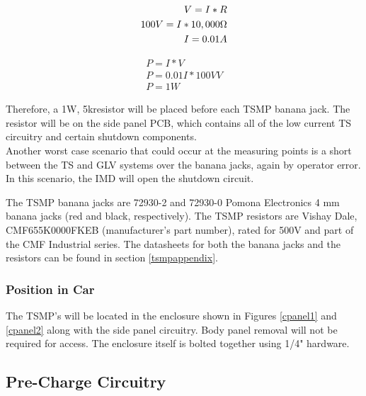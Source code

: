 \documentclass{article}
\begin{document}
            \begin{align}
                V = I * R \\
                100 V = I * 10,000 \ohm \\
                I = 0.01A
            \end{align}

            \begin{align}
                P = I * V \\
                P = 0.01 I * 100V V \\
                P = 1 W
            \end{align}

            Therefore, a 1W, 5k\ohm resistor will be placed before each TSMP banana jack. The resistor will be on the side panel PCB, which contains all of the low current TS circuitry and certain shutdown components. \\

            Another worst case scenario that could occur at the measuring points is a short between the TS and GLV systems over the banana jacks, again by operator error. In this scenario, the IMD will open the shutdown circuit.

            The TSMP banana jacks are 72930-2 and 72930-0 Pomona Electronics 4 mm banana jacks (red and black, respectively). The TSMP resistors are Vishay Dale, CMF655K0000FKEB  (manufacturer's part number), rated for 500V and part of the CMF Industrial series. The datasheets for both the banana jacks and the resistors can be found in section \ref{tsmpappendix}.


        \subsubsection{Position in Car}

            The TSMP's will be located in the enclosure shown in Figures \ref{cpanel1} and \ref{cpanel2} along with the side panel circuitry. Body panel removal will not be required for access. The enclosure itself is bolted together using 1/4" hardware.

    \subsection{Pre-Charge Circuitry}
\end{document}
